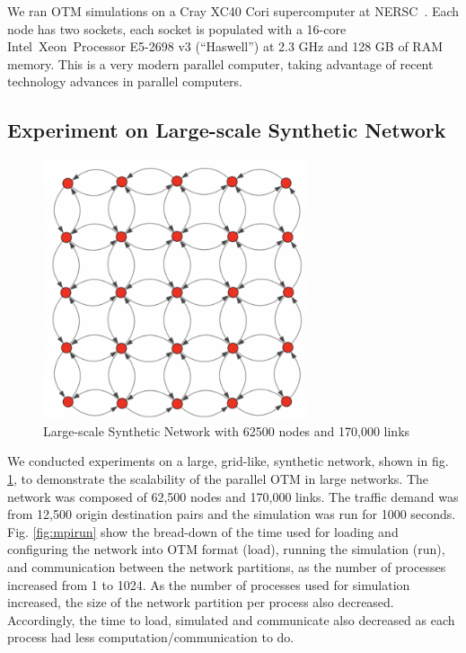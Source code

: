 We ran OTM simulations on a Cray XC40 Cori supercomputer at NERSC~\cite{Cori}. Each node has two sockets, each socket is
populated with a 16-core Intel\textcopyright~Xeon\texttrademark~Processor E5-2698 v3 (``Haswell'') at 2.3 GHz and 128 GB of RAM memory. This is a very modern parallel computer, taking advantage of recent technology advances in parallel computers.

\subsection{Experiment on Large-scale Synthetic Network}
\begin{figure}[h!]
    \centering
    \includegraphics[height=3in]{figs/Grid-Network.png}
    \caption{Large-scale Synthetic Network with 62500 nodes and 170,000 links}
    \label{fig:Synthetic_Network}
\end{figure}

We conducted experiments on a large, grid-like, synthetic network, shown in fig. \ref{fig:Synthetic_Network}, to demonstrate the scalability of the parallel OTM in large networks. The network was composed of 62,500 nodes and 170,000 links. The traffic demand was from 12,500 origin destination pairs and the simulation was run for 1000 seconds. Fig. \ref{fig:mpirun} show the bread-down of the time used for loading and configuring the network into OTM format (load), running the simulation (run), and communication between the network partitions, as the number of processes increased from 1 to 1024. As the number of processes used for simulation increased, the size of the network partition per process also decreased. Accordingly, the time to load, simulated and communicate also decreased as each process had less computation/communication to do.

